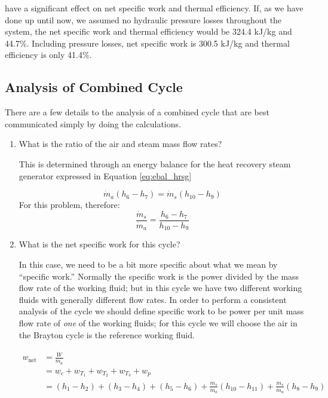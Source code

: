  have a significant effect on net specific work and thermal efficiency.  If, as we have done up until now, we assumed no hydraulic pressure losses throughout the system, the net specific work and thermal efficiency would be 324.4 kJ/kg and 44.7\%.  Including pressure losses, net specific work is 300.5 kJ/kg and thermal efficiency is only 41.4\%.

\subsection{Analysis of Combined Cycle}
There are a few details to the analysis of a combined cycle that are best communicated simply by doing the calculations.  

\begin{enumerate}
\item What is the ratio of the air and steam mass flow rates?

This is determined through an energy balance for the heat recovery steam generator expressed in Equation \ref{eq:ebal_hrsg}

\begin{equation}
\dot{m}_a (h_6 - h_7) = \dot{m}_s (h_{10}-h_9)
\label{eq:ebal_hrsg}
\end{equation}
For this problem, therefore:
$$ \frac{\dot{m}_s}{\dot{m}_a} = \frac{h_6 - h_7}{h_{10}-h_9}$$

\item What is the net specific work for this cycle?

In this case, we need to be a bit more specific about what we mean by ``specific work.'' Normally the specific work is the power divided by the mass flow rate of the working fluid; but in this cycle we have two different working fluids with generally different flow rates.  In order to perform a consistent analysis of the cycle we should define specific work to be power per unit mass flow rate of \emph{one} of the working fluids; for this cycle we will choose the air in the Brayton cycle is the reference working fluid.

\begin{align*}
w_{\text{net}} &= \frac{\dot{W}}{\dot{m}_a} \\
               &= w_c + w_{T_1} + w_{T_2} + w_{T_3} + w_p \\
&=(h_1 - h_2) + (h_3 - h_4) + (h_5 - h_6) + \frac{\dot{m}_s}{\dot{m}_a}(h_{10}-h_{11}) + \frac{\dot{m}_s}{\dot{m}_a}(h_8 - h_9)\\ 
\end{align*}


\end{enumerate}
